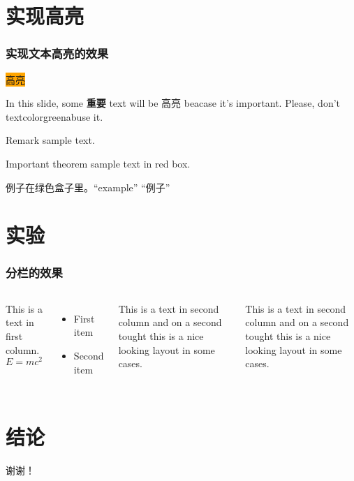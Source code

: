 \documentclass[12pt]{beamer}
\begin{document}
\section{实现高亮}
\begin{frame}
\frametitle{实现文本高亮的效果}
\colorbox{orange}{高亮}

In this slide, some \textbf{重要} text will be \alert{高亮} beacase it's important. 
Please, don't textcolor{green}{abuse} it.

\begin{block}{Remark}
	sample text.
\end{block}

\begin{alertblock}{Important theorem}
	sample text in red box.
\end{alertblock}

\begin{examples}
	例子在绿色盒子里。``example'' “例子”
\end{examples}

\end{frame}

\section{实验}
\begin{frame}
\frametitle{分栏的效果}
\begin{columns}
	This is a text in first column.
	$$E=mc^2$$
	\begin{itemize}
	\item First item 
	\item Second item 
	\end{itemize}

	This is a text in second column 
	and on a second tought this is a nice looking
	layout in some cases. 
	
	This is a text in second column 
	and on a second tought this is a nice looking
	layout in some cases. 
\end{columns}
\end{frame}


\section{结论}

\begin{frame}
\Huge{\centerline{谢谢！}}
\end{frame}
\end{document}
